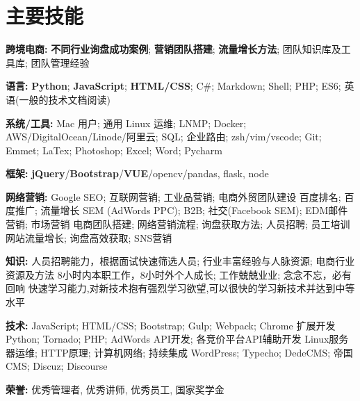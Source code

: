 \section{\textbf{主要技能}}
\resumeSubHeadingListStart
\item{
  \textbf{跨境电商:}{ \textbf{不同行业询盘成功案例}; \textbf{营销团队搭建}; \textbf{流量增长方法}; 团队知识库及工具库; 团队管理经验}
}
\item{
  \textbf{语言:}{ \textbf{Python}; \textbf{JavaScript}; \textbf{HTML/CSS}; C\#; Markdown; Shell; PHP; ES6; 英语(一般的技术文档阅读)}
}
\item{
 \textbf{系统/工具:}{ Mac 用户; 通用 Linux 运维; LNMP; Docker; AWS/DigitalOcean/Linode/阿里云; SQL; 企业路由; zsh/vim/vscode; Git; Emmet; LaTex; Photoshop; Excel; Word; Pycharm}
}
\item{
 \textbf{框架:}{ \textbf{jQuery}/\textbf{Bootstrap}/\textbf{VUE}/opencv/pandas, flask, node}
}
\item{
  \textbf{网络营销:}{
    \resumeItemListStart
       {Google SEO; 互联网营销; 工业品营销; 电商外贸团队建设 }
       {百度排名; 百度推广; 流量增长}
       {SEM (AdWords PPC); B2B; 社交(Facebook SEM); EDM邮件营销; 市场营销 }
       {电商团队搭建; 网络营销流程; 询盘获取方法; 人员招聘; 员工培训 }
       {网站流量增长; 询盘高效获取; SNS营销}
   \resumeItemListEnd
  }
}
\item{
  \textbf{知识:}{
    \resumeItemListStart
       {人员招聘能力，根据面试快速筛选人员; 行业丰富经验与人脉资源; 电商行业资源及方法}
       {8小时内本职工作，8小时外个人成长; 工作兢兢业业; 念念不忘，必有回响}
       {快速学习能力,对新技术抱有强烈学习欲望,可以很快的学习新技术并达到中等水平}
   \resumeItemListEnd
  }
}
\item{
  \textbf{技术:}{
    \resumeItemListStart
       {JavaScript; HTML/CSS; Bootstrap; Gulp; Webpack; Chrome 扩展开发}
       {Python; Tornado; PHP; AdWords API开发; 各竞价平台API辅助开发}
       {Linux服务器运维; HTTP原理; 计算机网络; 持续集成}
       {WordPress; Typecho; DedeCMS; 帝国 CMS; Discuz; Discourse}
   \resumeItemListEnd
  }
}
\item{
 \textbf{荣誉:}{
  优秀管理者, 优秀讲师, 优秀员工, 国家奖学金
 }
}
\resumeSubHeadingListEnd
